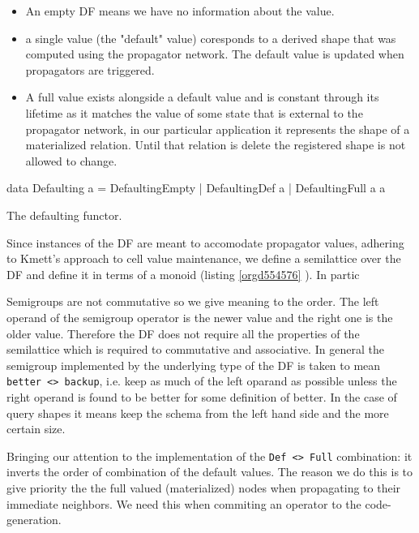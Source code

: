 \begin{itemize}
\item An empty DF means we have no information about the value.
\item a single value (the "default" value) coresponds to a derived shape
  that was computed using the propagator network. The default value is
  updated when propagators are triggered.
\item A full value exists alongside a default value and is constant
  through its lifetime as it matches the value of some state that is
  external to the propagator network, in our particular application it
  represents the shape of a materialized relation. Until that relation
  is delete the registered shape is not allowed to change.
\end{itemize}
\begin{listing}[p]
  \begin{haskell}
    data Defaulting a =
      DefaultingEmpty
      | DefaultingDef a
      | DefaultingFull a a\end{haskell}
  \caption{\label{org4edd50c}The defaulting functor.}
\end{listing}

Since instances of the DF are meant to accomodate propagator values,
adhering to Kmett's approach to cell value maintenance, we define a
semilattice over the DF and define it in terms of a monoid (listing
\ref{orgd554576} ). In partic

Semigroups are not commutative so we give meaning to the order. The
left operand of the semigroup operator is the newer value and the
right one is the older value. Therefore the DF does not require all
the properties of the semilattice which is required to commutative and
associative. In general the semigroup implemented by the underlying
type of the DF is taken to mean \texttt{better <> backup}, i.e. keep as much
of the left oparand as possible unless the right operand is found to
be better for some definition of better. In the case of query shapes
it means keep the schema from the left hand side and the more certain
size.

Bringing our attention to the implementation of the \texttt{Def <> Full}
combination: it inverts the order of combination of the default
values. The reason we do this is to give priority the the full valued
(materialized) nodes when propagating to their immediate neighbors. We
need this when commiting an operator to the code-generation.

